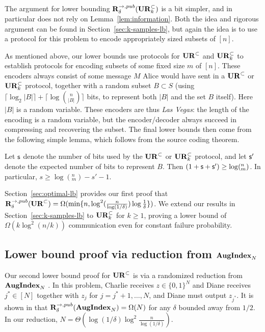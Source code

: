 The argument for lower bounding $\mathbf{R}^{\rightarrow,pub}_\delta(\mathbf{UR}_k^\subset)$ is a bit simpler, and in particular does not rely on Lemma~\ref{lem:information}. Both the idea and rigorous argument can be found in Section~\ref{sec:k-samples-lb}, but again the idea is to use a protocol for this problem to encode appropriately sized subsets of $[n]$.
 
As mentioned above, our lower bounds use protocols for $\mathbf{UR}^\subset$ and $\mathbf{UR}^\subset_k$ to establish protocols for encoding subsets of some fixed size $m$ of $[n]$. These encoders always consist of some message $M$ Alice would have sent in a $\mathbf{UR}^\subset$ or $\mathbf{UR}^\subset_k$ protocol, together with a random subset $B\subset S$ (using $\lceil \log_2|B|\rceil + \lceil\log{n\choose |B|}\rceil$ bits, to represent both $|B|$ and the set $B$ itself). Here $|B|$ is a random variable. These encoders are thus {\em Las Vegas}: the length of the encoding is a random variable, but the encoder/decoder always succeed in compressing and recovering the subset. The final lower bounds then come from the following simple lemma, which follows from the source coding theorem. 

\begin{lemma} \label{lemma:lb-meta}
  Let $\textsf{s}$ denote the number of bits used by the $\mathbf{UR}^\subset$ or $\mathbf{UR}^\subset_k$ protocol, and let $\textsf{s}'$ denote the expected number of bits to represent $B$. Then $(1+\textsf{s}+\textsf{s}') \ge \log (^n_m)$. In particular, $s \ge \log(^n_m) - s' - 1$.
\end{lemma}

Section~\ref{sec:optimal-lb} provides our first proof that $\mathbf{R}^{\rightarrow,pub}_\delta(\mathbf{UR}^\subset) = \Omega(\min\{n, \log^2(\frac n{\log(1/\delta)}) \log \frac{1}{\delta}\})$. We extend our results in Section~\ref{sec:k-samples-lb} to $\mathbf{UR}_k^\subset$ for $k\ge 1$, proving a lower bound of $\Omega(k\log^2(n/k))$ communication even for constant failure probability.

\subsection{Lower bound proof via reduction from $\mathbf{AugIndex}_N$}

Our second lower bound proof for $\mathbf{UR}^\subset$ is via a randomized reduction from $\mathbf{AugIndex}_N$ \cite{MiltersenNSW98}. In this problem, Charlie receives $z\in\{0,1\}^N$ and Diane receives $j^*\in[N]$ together with $z_j$ for $j=j^*+1,\ldots,N$, and Diane must output $z_{j^*}$. It is shown in \cite{MiltersenNSW98} that $\mathbf{R}^{\rightarrow, pub}_\delta(\mathbf{AugIndex}_N) = \Omega(N)$ for any $\delta$ bounded away from $1/2$. In our reduction, $N = \Theta(\log(1/\delta)\log^2\frac n{\log(1/\delta)})$.

